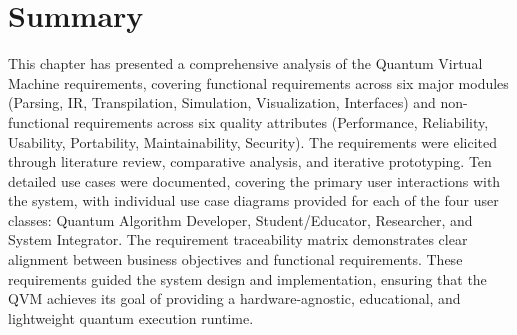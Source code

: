 \section{Summary}
This chapter has presented a comprehensive analysis of the Quantum Virtual Machine requirements, covering functional requirements across six major modules (Parsing, IR, Transpilation, Simulation, Visualization, Interfaces) and non-functional requirements across six quality attributes (Performance, Reliability, Usability, Portability, Maintainability, Security). The requirements were elicited through literature review, comparative analysis, and iterative prototyping. Ten detailed use cases were documented, covering the primary user interactions with the system, with individual use case diagrams provided for each of the four user classes: Quantum Algorithm Developer, Student/Educator, Researcher, and System Integrator. The requirement traceability matrix demonstrates clear alignment between business objectives and functional requirements. These requirements guided the system design and implementation, ensuring that the QVM achieves its goal of providing a hardware-agnostic, educational, and lightweight quantum execution runtime.
